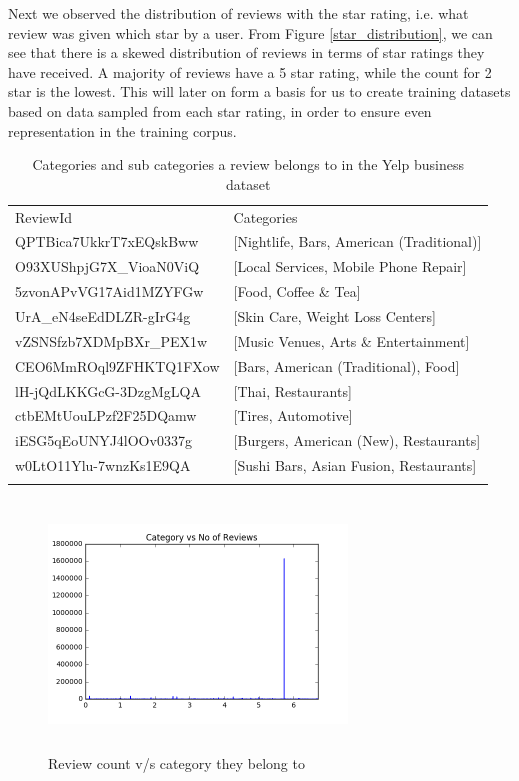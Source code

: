 \documentclass[paper=a4, fontsize=11pt]{scrartcl} %
\numberwithin{equation}{section} %
\numberwithin{figure}{section} %
\numberwithin{table}{section} %
\begin{document}
Next we observed the distribution of reviews with the star rating, i.e. what review was given which star by a user. From Figure \ref{star_distribution}, we can see that there is a skewed distribution of reviews in terms of star ratings they have received. A majority of reviews have a 5 star rating, while the count for 2 star is the lowest. This will later on form a basis for us to create training datasets based on data sampled from each star rating, in order to ensure even representation in the training corpus.

\begin{table}[!htb]
 \centering
 \caption{Categories and sub categories a review belongs to in the Yelp business dataset}
 \label{review_cat_table}
 \begin{tabular}{l l} 
    \noalign{\smallskip}\hline\noalign{\smallskip}
    ReviewId & Categories \\
    \noalign{\smallskip}\hline\noalign{\smallskip}
	QPTBica7UkkrT7xEQskBww & [Nightlife, Bars, American (Traditional)] \\
O93XUShpjG7X\_VioaN0ViQ & [Local Services, Mobile Phone Repair] \\
5zvonAPvVG17Aid1MZYFGw & [Food, Coffee \& Tea] \\
UrA\_eN4seEdDLZR-gIrG4g & [Skin Care, Weight Loss Centers] \\
vZSNSfzb7XDMpBXr\_PEX1w & [Music Venues, Arts \& Entertainment] \\
CEO6MmROql9ZFHKTQ1FXow  & [Bars, American (Traditional), Food] \\
lH-jQdLKKGcG-3DzgMgLQA & [Thai, Restaurants] \\
ctbEMtUouLPzf2F25DQamw & [Tires, Automotive] \\
iESG5qEoUNYJ4lOOv0337g & [Burgers, American (New), Restaurants] \\
w0LtO11Ylu-7wnzKs1E9QA & [Sushi Bars, Asian Fusion, Restaurants] \\
    \noalign{\smallskip}\hline
  \end{tabular} 
\end{table}  

\begin{figure}[!htb]
\centering
\includegraphics[width=300px, height = 250px]{category_reviews.png}
\caption{Review count v/s category they belong to}
\label{category_reviews}
\end{figure} 
\end{document}
